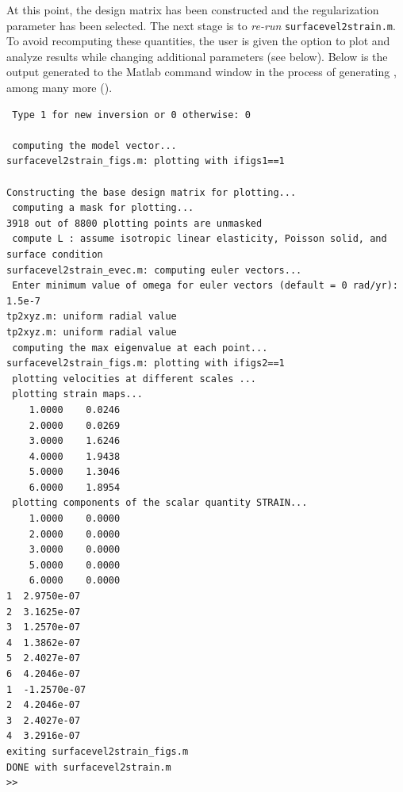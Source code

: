 \documentclass[11pt,titlepage,fleqn]{article}
\begin{document}
\noindent
At this point, the design matrix has been constructed and the regularization parameter has been selected. The next stage is to {\em re-run} \verb+surfacevel2strain.m+. To avoid recomputing these quantities, the user is given the option to plot and analyze results while changing additional parameters (see below). Below is the output generated to the Matlab command window in the process of generating , among many more ().

\begin{spacing}{1.0}
\begin{verbatim}
 Type 1 for new inversion or 0 otherwise: 0
  
 computing the model vector...
surfacevel2strain_figs.m: plotting with ifigs1==1
  
Constructing the base design matrix for plotting...
 computing a mask for plotting...
3918 out of 8800 plotting points are unmasked
 compute L : assume isotropic linear elasticity, Poisson solid, and surface condition
surfacevel2strain_evec.m: computing euler vectors...
 Enter minimum value of omega for euler vectors (default = 0 rad/yr): 1.5e-7
tp2xyz.m: uniform radial value
tp2xyz.m: uniform radial value
 computing the max eigenvalue at each point...
surfacevel2strain_figs.m: plotting with ifigs2==1
 plotting velocities at different scales ...
 plotting strain maps...
    1.0000    0.0246
    2.0000    0.0269
    3.0000    1.6246
    4.0000    1.9438
    5.0000    1.3046
    6.0000    1.8954
 plotting components of the scalar quantity STRAIN...
    1.0000    0.0000
    2.0000    0.0000
    3.0000    0.0000
    5.0000    0.0000
    6.0000    0.0000
1  2.9750e-07
2  3.1625e-07
3  1.2570e-07
4  1.3862e-07
5  2.4027e-07
6  4.2046e-07
1  -1.2570e-07
2  4.2046e-07
3  2.4027e-07
4  3.2916e-07
exiting surfacevel2strain_figs.m
DONE with surfacevel2strain.m
>> 
\end{verbatim}
\end{spacing}


\normalsize
\end{document}
